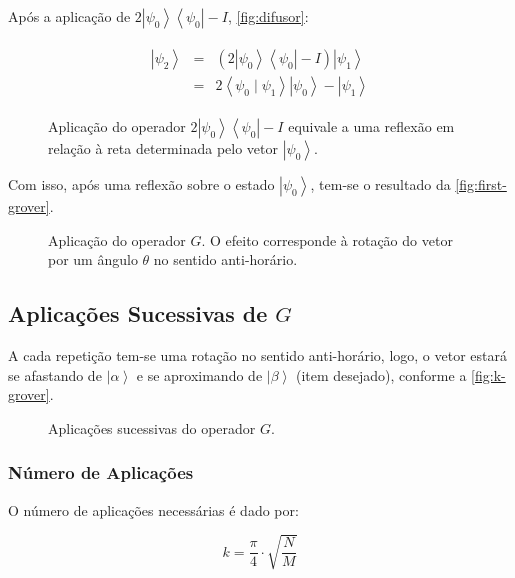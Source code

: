 Após a aplicação de \(2\left| \psi_0 \right\rangle \left\langle \psi_0 \right| - I\), \autoref{fig:difusor}:

\[\begin{aligned}
\begin{matrix}
\left| \psi_2 \right\rangle &=& (2\left| \psi_0 \right\rangle \left\langle \psi_0 \right| - I) \left| \psi_1 \right\rangle \\
&=& 2 \left\langle \psi_0 \mid \psi_1 \right\rangle \left| \psi_0 \right\rangle - \left| \psi_1 \right\rangle
\end{matrix}
\end{aligned}\]

\begin{figure}[!htb]
  \centering
  
  \caption{Aplicação do operador \(2 \left| \psi_0 \right\rangle \left\langle \psi_0 \right| - I\) equivale a uma reflexão em relação à reta determinada pelo vetor \(\left| \psi_0 \right\rangle\)\cite{giovani}.
  }
  \label{fig:difusor}
\end{figure}

Com isso, após uma reflexão sobre o estado \(\left| \psi_0 \right\rangle\), tem-se o resultado da \autoref{fig:first-grover}.

\begin{figure}[!htb]
  \centering
  
  \caption{Aplicação do operador \(G\).
  O efeito corresponde à rotação do vetor por um ângulo \(\theta\) no sentido anti-horário\cite{giovani}.
  }
  \label{fig:first-grover}
\end{figure}

\subsection{Aplicações Sucessivas de \(G\)}\label{subsec:aplicacoes-sucessivas-de-g}

A cada repetição tem-se uma rotação no sentido anti-horário, logo, o vetor estará se afastando de \(\left| \alpha\right\rangle\) e se aproximando de \(\left| \beta \right\rangle\) (item desejado), conforme a \autoref{fig:k-grover}.

\begin{figure}[!htb]
  \centering
  
  \caption{Aplicações sucessivas do operador \(G\).}
  \label{fig:k-grover}
\end{figure}

\subsubsection{Número de Aplicações}\label{subsubsec:numero-de-aplicacoes}

O número de aplicações necessárias é dado por:

\[k = \dfrac{\pi}{4} \cdot \sqrt{\dfrac{N}{M}}\]

